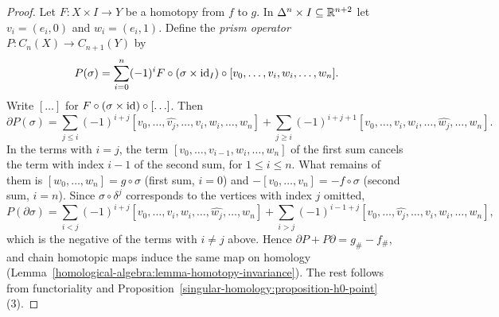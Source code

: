\begin{proof}
Let $F \colon X \times I \to Y$ be a homotopy from $f$ to $g$. In $\Delta^n \times I \subseteq \mathbb{R}^{n+2}$ let $v_i = (e_i, 0)$ and $w_i = (e_i, 1)$. Define the
\emph{prism operator} $P \colon C_n(X) \to C_{n+1}(Y)$ by
\[
P(\sigma) = \sum_{i=0}^n (-1)^i F \circ (\sigma \times \mathrm{id}_I) \circ [v_0, \ldots, v_i, w_i, \ldots, w_n].
\]
Write $[\ldots]$ for $F \circ (\sigma \times \mathrm{id}) \circ [\ldots]$. Then
\[
\partial P(\sigma) = \sum_{j \leq i}(-1)^{i+j}[v_0, \ldots, \widehat{v_j}, \ldots, v_i, w_i, \ldots, w_n]
+ \sum_{j \geq i}(-1)^{i+j+1}[v_0, \ldots, v_i, w_i, \ldots, \widehat{w_j}, \ldots, w_n].
\]
In the terms with $i = j$, the term $[v_0, \ldots, v_{i-1}, w_i, \ldots, w_n]$ of the first sum cancels the term with index $i - 1$ of the second sum, for
$1 \leq i \leq n$. What remains of them is $[w_0, \ldots, w_n] = g \circ \sigma$ (first sum, $i = 0$) and $-[v_0, \ldots, v_n] = -f \circ \sigma$ (second sum,
$i = n$). Since $\sigma \circ \delta^j$ corresponds to the vertices with index $j$ omitted,
\[
P(\partial\sigma) = \sum_{i < j}(-1)^{i+j}[v_0, \ldots, v_i, w_i, \ldots, \widehat{w_j}, \ldots, w_n] + \sum_{i > j}(-1)^{i-1+j}[v_0, \ldots, \widehat{v_j}, \ldots, v_i, w_i, \ldots, w_n],
\]
which is the negative of the terms with $i \neq j$ above. Hence $\partial P + P\partial = g_\# - f_\#$, and chain homotopic maps induce the same map on homology
(Lemma~\ref{homological-algebra:lemma-homotopy-invariance}). The rest follows from functoriality and Proposition~\ref{singular-homology:proposition-h0-point}(3).
\end{proof}


